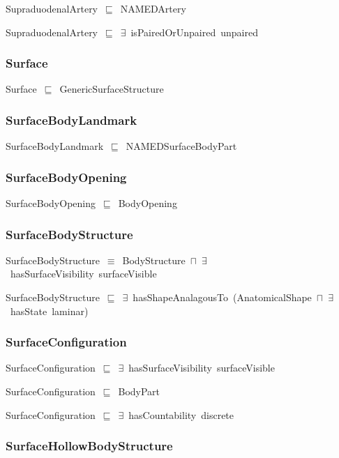 \documentclass{article}
\begin{document}
SupraduodenalArtery~\ensuremath{\sqsubseteq}~NAMEDArtery~

SupraduodenalArtery~\ensuremath{\sqsubseteq}~\ensuremath{\exists}~isPairedOrUnpaired~unpaired~

\subsubsection*{Surface}

Surface~\ensuremath{\sqsubseteq}~GenericSurfaceStructure~

\subsubsection*{SurfaceBodyLandmark}

SurfaceBodyLandmark~\ensuremath{\sqsubseteq}~NAMEDSurfaceBodyPart~

\subsubsection*{SurfaceBodyOpening}

SurfaceBodyOpening~\ensuremath{\sqsubseteq}~BodyOpening~

\subsubsection*{SurfaceBodyStructure}

SurfaceBodyStructure~\ensuremath{\equiv}~BodyStructure~\ensuremath{\sqcap}~\ensuremath{\exists}~hasSurfaceVisibility~surfaceVisible

SurfaceBodyStructure~\ensuremath{\sqsubseteq}~\ensuremath{\exists}~hasShapeAnalagousTo~(AnatomicalShape~\ensuremath{\sqcap}~\ensuremath{\exists}~hasState~laminar)~

\subsubsection*{SurfaceConfiguration}

SurfaceConfiguration~\ensuremath{\sqsubseteq}~\ensuremath{\exists}~hasSurfaceVisibility~surfaceVisible~

SurfaceConfiguration~\ensuremath{\sqsubseteq}~BodyPart~

SurfaceConfiguration~\ensuremath{\sqsubseteq}~\ensuremath{\exists}~hasCountability~discrete~

\subsubsection*{SurfaceHollowBodyStructure}
\end{document}
